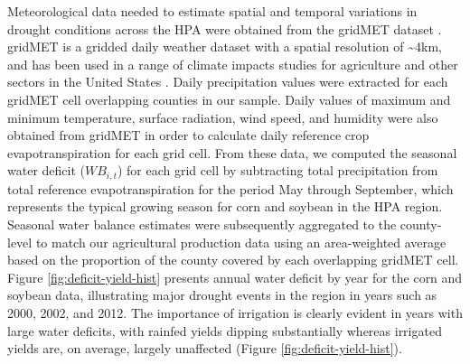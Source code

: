 \documentclass[
]{article}
\begin{document}
Meteorological data needed to estimate spatial and temporal variations in drought conditions across the HPA were obtained from the gridMET dataset \citep{Abatzoglou2013}. gridMET is a gridded daily weather dataset with a spatial resolution of \textasciitilde4km, and has been used in a range of climate impacts studies for agriculture and other sectors in the United States \citep{abatzoglou2016impact, pereira2015crop, crane2018machine, venkatappa2021impacts, zhu2019dissecting}. Daily precipitation values were extracted for each gridMET cell overlapping counties in our sample. Daily values of maximum and minimum temperature, surface radiation, wind speed, and humidity were also obtained from gridMET in order to calculate daily reference crop evapotranspiration for each grid cell. From these data, we computed the seasonal water deficit (\(WB_{i,t}\)) for each grid cell by subtracting total precipitation from total reference evapotranspiration for the period May through September, which represents the typical growing season for corn and soybean in the HPA region. Seasonal water balance estimates were subsequently aggregated to the county-level to match our agricultural production data using an area-weighted average based on the proportion of the county covered by each overlapping gridMET cell. Figure \ref{fig:deficit-yield-hist} presents annual water deficit by year for the corn and soybean data, illustrating major drought events in the region in years such as 2000, 2002, and 2012. The importance of irrigation is clearly evident in years with large water deficits, with rainfed yields dipping substantially whereas irrigated yields are, on average, largely unaffected (Figure \ref{fig:deficit-yield-hist}).
\end{document}
